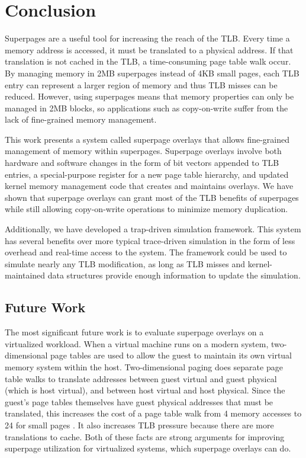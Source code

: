 \chapter{Conclusion}

Superpages are a useful tool for increasing the reach of the TLB. Every time a memory address is accessed, it must be translated to a physical address. If that translation is not cached in the TLB, a time-consuming page table walk occur. By managing memory in 2MB superpages instead of 4KB small pages, each TLB entry can represent a larger region of memory and thus TLB misses can be reduced. However, using superpages means that memory properties can only be managed in 2MB blocks, so applications such as copy-on-write suffer from the lack of fine-grained memory management.

This work presents a system called superpage overlays that allows fine-grained management of memory within superpages. Superpage overlays involve both hardware and software changes in the form of bit vectors appended to TLB entries, a special-purpose register for a new page table hierarchy, and updated kernel memory management code that creates and maintains overlays. We have shown that superpage overlays can grant most of the TLB benefits of superpages while still allowing copy-on-write operations to minimize memory duplication.

Additionally, we have developed a trap-driven simulation framework. This system has several benefits over more typical trace-driven simulation in the form of less overhead and real-time access to the system. The framework could be used to simulate nearly any TLB modification, as long as TLB misses and kernel-maintained data structures provide enough information to update the simulation.

\section{Future Work}
The most significant future work is to evaluate superpage overlays on a virtualized workload. When a virtual machine runs on a modern system, two-dimensional page tables are used to allow the guest to maintain its own virtual memory system within the host. Two-dimensional paging does separate page table walks to translate addresses between guest virtual and guest physical (which is host virtual), and between host virtual and host physical. Since the guest's page tables themselves have guest physical addresses that must be translated, this increases the cost of a page table walk from 4 memory accesses to 24 for small pages \cite{Bhargava}. It also increases TLB pressure because there are more translations to cache. Both of these facts are strong arguments for improving superpage utilization for virtualized systems, which superpage overlays can do.

